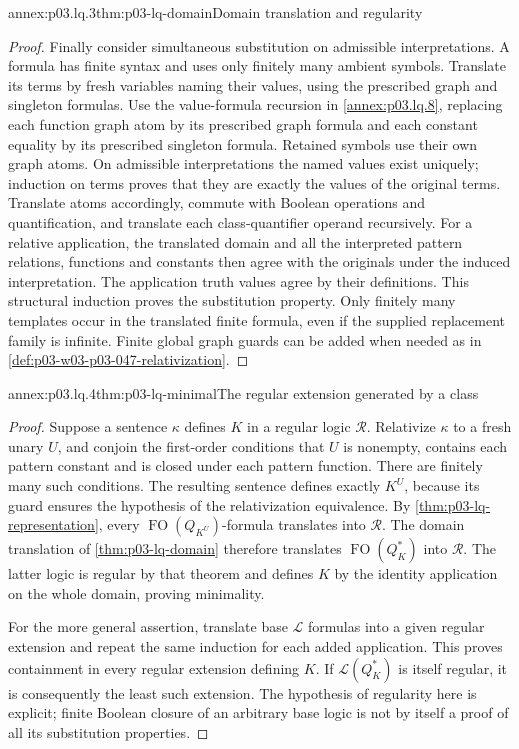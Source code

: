 \begin{annexitem}{annex:p03.lq.3}{thm:p03-lq-domain}{Domain translation and regularity}
\begin{proof}
Finally consider simultaneous substitution on admissible
interpretations. A formula has finite syntax and uses only finitely
many ambient symbols. Translate its terms by fresh variables naming
their values, using the prescribed graph and singleton formulas.
Use the value-formula recursion in
\cref{annex:p03.lq.8}, replacing each function graph
atom by its prescribed graph formula and each constant equality by
its prescribed singleton formula. Retained symbols use their own
graph atoms. On admissible interpretations the named values exist
uniquely; induction on terms proves that they are exactly the values
of the original terms. Translate atoms accordingly,
commute with Boolean operations and quantification, and translate
each class-quantifier operand recursively. For a relative
application, the translated domain and all the interpreted pattern
relations, functions and constants then agree with the originals
under the induced interpretation. The application truth values
agree by their definitions. This structural induction proves the
substitution property. Only finitely many templates occur in the
translated finite formula, even if the supplied replacement family
is infinite. Finite global graph guards can be added when needed
as in \cref{def:p03-w03-p03-047-relativization}.
\end{proof}
\end{annexitem}

\begin{annexitem}{annex:p03.lq.4}{thm:p03-lq-minimal}{The regular extension generated by a class}
\begin{proof}
Suppose a sentence \(\kappa\) defines \(K\) in a regular logic
\(\mathscr R\). Relativize \(\kappa\) to a fresh unary \(U\),
and conjoin the first-order conditions that \(U\) is nonempty,
contains each pattern constant and is closed under each pattern
function. There are finitely many such conditions. The resulting
sentence defines exactly \(K^U\), because its guard ensures the
hypothesis of the relativization equivalence. By
\cref{thm:p03-lq-representation}, every
\(\operatorname{FO}(Q_{K^U})\)-formula translates into
\(\mathscr R\). The domain translation of
\cref{thm:p03-lq-domain} therefore translates
\(\operatorname{FO}(Q_K^*)\) into \(\mathscr R\).
The latter logic is regular by that theorem and defines \(K\)
by the identity application on the whole domain, proving minimality.

For the more general assertion, translate base \(\mathscr L\)
formulas into a given regular extension and repeat the same
induction for each added application. This proves containment in
every regular extension defining \(K\). If
\(\mathscr L(Q_K^*)\) is itself regular, it is consequently the
least such extension. The hypothesis of regularity here is explicit;
finite Boolean closure of an arbitrary base logic is not by itself
a proof of all its substitution properties.
\end{proof}
\end{annexitem}

